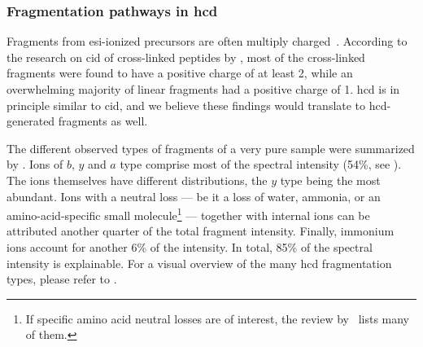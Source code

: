 \subsubsection{Fragmentation pathways in \gls*{hcd}}

Fragments from \gls*{esi}-ionized precursors are often multiply charged~\cite{katta1991use, michalski2012systematic}. According to the research on \gls*{cid} of cross-linked peptides by \citet{giese2016study}, most of the cross-linked fragments were found to have a positive charge of at least 2, while an overwhelming majority of linear fragments had a positive charge of 1. \gls*{hcd} is in principle similar to \gls*{cid}, and we believe these findings would translate to \gls*{hcd}-generated fragments as well.

The different observed types of fragments of a very pure sample were summarized by \citet{michalski2012systematic}. Ions of \(b\), \(y\) and \(a\) type comprise most of the spectral intensity (54\%, see ). The ions themselves have different distributions, the \(y\) type being the most abundant. Ions with a neutral loss --- be it a loss of water, ammonia, or an amino-acid-specific small molecule\footnote{If specific amino acid neutral losses are of interest, the review by~\citet{paizs2005fragmentation} lists many of them.} --- together with internal ions can be attributed another quarter of the total fragment intensity. Finally, immonium ions account for another 6\% of the intensity. In total, 85\% of the spectral intensity is explainable. For a visual overview of the many \gls*{hcd} fragmentation types, please refer to .

